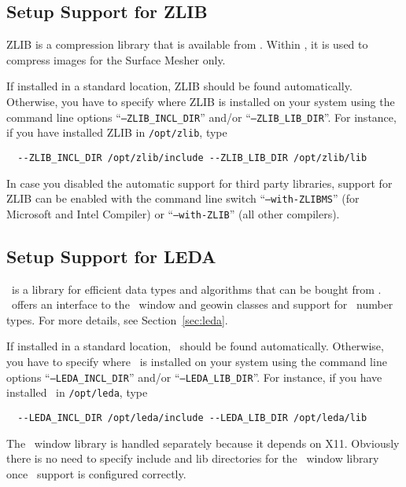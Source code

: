 \subsection{Setup Support for ZLIB\label{sec:zlib-setup}}

ZLIB is a compression library that is available from \zlibpage.
Within \cgal, it is used to compress images for the Surface Mesher
only.

If installed in a standard location, ZLIB should be found
automatically.  Otherwise, you have to specify where ZLIB is installed
on your system using the command line options
``\texttt{--ZLIB\_INCL\_DIR}'' and/or ``\texttt{--ZLIB\_LIB\_DIR}''.
For instance, if you have installed ZLIB in \texttt{/opt/zlib}, type
\begin{verbatim}
  --ZLIB_INCL_DIR /opt/zlib/include --ZLIB_LIB_DIR /opt/zlib/lib
\end{verbatim}

In case you disabled the automatic support for third party libraries,
support for ZLIB can be enabled with the command line switch
``\texttt{--with-ZLIBMS}'' (for Microsoft and Intel Compiler) or
``\texttt{--with-ZLIB}'' (all other compilers).

\subsection{Setup Support for LEDA\label{sec:leda-setup}}

\leda\ is a library for efficient data types and algorithms that can
be bought from \ledapage. \cgal\ offers an interface to the \leda\
window and geowin classes and support for \leda\ number types. For
more details, see Section~\ref{sec:leda}.

If installed in a standard location, \leda\ should be found
automatically. Otherwise, you have to specify where \leda\ is
installed on your system using the command line options
``\texttt{--LEDA\_INCL\_DIR}'' and/or ``\texttt{--LEDA\_LIB\_DIR}''.
For instance, if you have installed \leda\ in \texttt{/opt/leda}, type
\begin{verbatim}
  --LEDA_INCL_DIR /opt/leda/include --LEDA_LIB_DIR /opt/leda/lib
\end{verbatim}

The \leda\ window library is handled separately because it depends on
X11. Obviously there is no need to specify include and lib directories
for the \leda\ window library once \leda\ support is configured
correctly.

